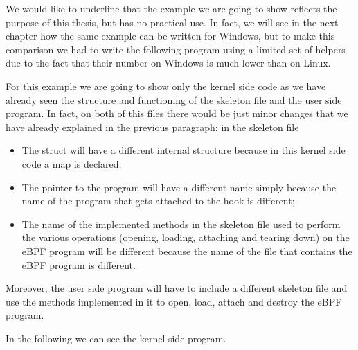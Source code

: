 We would like to underline that the example we are going to show reflects the purpose of this thesis, but has no practical use.
In fact, we will see in the next chapter how the same example can be written for Windows, but to make this comparison we had to write the following program using a limited set of helpers due to the fact that their number on Windows is much lower than on Linux.

For this example we are going to show only the kernel side code as we have already seen the structure and functioning of the skeleton file and the user side program.
In fact, on both of this files there would be just minor changes that we have already explained in the previous paragraph: in the skeleton file 

\begin{itemize}
	\item The struct will have a different internal structure because in this
		kernel side code a map is declared;
	\item The pointer to the program will have a different name simply because the 
		name of the program that gets attached to the hook is different; 
	\item The name of the implemented methods in the skeleton file used to perform the
		various operations (opening, loading, attaching and tearing down) on the eBPF program will be different because the name of the file that contains the eBPF program is different.
\end{itemize}

Moreover, the user side program will have to include a different skeleton file and use the methods implemented in it to open, load, attach and destroy the eBPF program.

In the following we can see the kernel side program.

